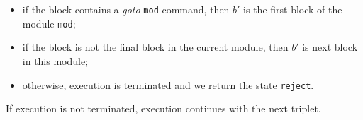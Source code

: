 \begin{appendices}
\begin{itemize}
\begin{itemize}
\begin{itemize}
            \item if the block contains a \textit{goto} \texttt{mod} command, then $b'$ is the first block of the module \texttt{mod};
            \item if the block is not the final block in the current module, then $b'$ is next block in this module;
            \item otherwise, execution is terminated and we return the state \texttt{reject}.
        \end{itemize}
    \end{itemize}
    If execution is not terminated, execution continues with the next triplet.
\end{itemize}

% 



\end{appendices}
